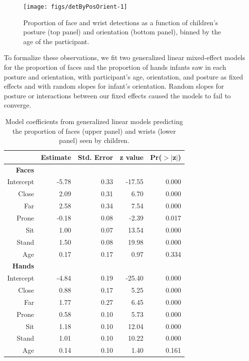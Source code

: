 \documentclass[10pt, letterpaper]{article}
\newenvironment{CodeChunk}{}{}
\begin{document}
\begin{CodeChunk}
\begin{figure}[h]

{\centering \texttt{[image: figs/detByPosOrient-1]} 

}

\caption[Proportion of face and wrist detections as a function of children's posture (top panel) and orientation (bottom panel), binned by the age of the participant]{Proportion of face and wrist detections as a function of children's posture (top panel) and orientation (bottom panel), binned by the age of the participant.}\label{fig:detByPosOrient}
\end{figure}
\end{CodeChunk}

To formalize these observations, we fit two generalized linear
mixed-effect models for the proportion of faces and the proportion of
hands infants saw in each posture and orientation, with participant's
age, orientation, and posture as fixed effects and with random slopes
for infant's orientation. Random slopes for posture or interactions
between our fixed effects caused the models to fail to converge.

\begin{table}[ht]
\centering
\begin{tabular}{rrrrr}
  \hline
 & Estimate & Std. Error & z value & Pr($>$$|$z$|$) \\ 
  \hline
  \textbf{Faces} \\
Intercept & -5.78 & 0.33 & -17.55 & 0.000 \\ 
  Close & 2.09 & 0.31 & 6.70 & 0.000 \\ 
  Far & 2.58 & 0.34 & 7.54 & 0.000 \\ 
  Prone & -0.18 & 0.08 & -2.39 & 0.017 \\ 
  Sit & 1.00 & 0.07 & 13.54 & 0.000 \\ 
  Stand & 1.50 & 0.08 & 19.98 & 0.000 \\ 
  Age & 0.17 & 0.17 & 0.97 & 0.334 \\ 
  \hline
  \textbf{Hands} \\
  Intercept & -4.84 & 0.19 & -25.40 & 0.000 \\ 
  Close & 0.88 & 0.17 & 5.25 & 0.000 \\ 
  Far & 1.77 & 0.27 & 6.45 & 0.000 \\ 
  Prone & 0.58 & 0.10 & 5.73 & 0.000 \\ 
  Sit & 1.18 & 0.10 & 12.04 & 0.000 \\ 
  Stand & 1.01 & 0.10 & 10.22 & 0.000 \\ 
  Age & 0.14 & 0.10 & 1.40 & 0.161 \\ 
   \hline
\end{tabular}
\caption{Model coefficients from generalized linear models predicting the proportion of faces (upper panel) and wrists (lower panel) seen by children.} 
\end{table}
\end{document}
